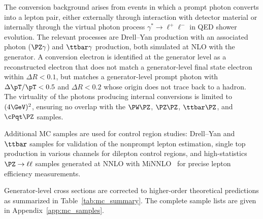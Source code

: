 The conversion background arises from events in which a prompt photon converts into a lepton pair, either externally through interaction with detector material or internally through the virtual photon process $\gamma^{*} \to \ell^{+}\ell^{-}$ in QED shower evolution. The relevant processes are Drell--Yan production with an associated photon ($\PZ\gamma$) and $\ttbar\gamma$ production, both simulated at NLO with the \MGvATNLO generator. A conversion electron is identified at the generator level as a reconstructed electron that does not match a generator-level final state electron within $\Delta R < 0.1$, but matches a generator-level prompt photon with $\Delta\pT/\pT < 0.5$ and $\Delta R < 0.2$ whose origin does not trace back to a hadron. The virtuality of the photons producing internal conversions is limited to $(4\GeV)^{2}$, ensuring no overlap with the $\PW\PZ$, $\PZ\PZ$, $\ttbar\PZ$, and $\cPqt\PZ$ samples.

Additional MC samples are used for control region studies: Drell--Yan and $\ttbar$ samples for validation of the nonprompt lepton estimation, single top production in various channels for dilepton control regions, and high-statistics $\PZ \to \ell\ell$ samples generated at NNLO with \POWHEG MiNNLO~\cite{PowhegMiNNLO_Z1,PowhegMiNNLO_Z2} for precise lepton efficiency measurements.

Generator-level cross sections are corrected to higher-order theoretical predictions as summarized in Table~\ref{tab:mc_summary}. The complete sample lists are given in Appendix~\ref{app:mc_samples}.

